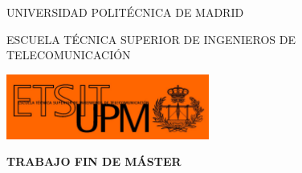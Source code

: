 \pagecolor{etsitorange}
\begin{titlepage}
	\centering
	{\scshape\LARGE UNIVERSIDAD POLITÉCNICA DE MADRID \par}
	\vspace{0.5cm}
	{\scshape\Large ESCUELA TÉCNICA SUPERIOR DE INGENIEROS DE TELECOMUNICACIÓN \par}
	\vspace{0.5cm}	
	\includegraphics[width=0.5\textwidth]{./img/01_front/logoescuela_naranja.jpg}\par\vspace{1cm} %
	{\huge\bfseries TRABAJO FIN DE MÁSTER\par}
	\vspace{0.5cm}
	{\scshape\Large \myMaster \par}
	\vspace{1cm}
	{\huge\bfseries \myTitleEN \par}
	\vspace{1cm}
	{\Large\itshape \myFullname \par}
	\vfill
	{\large \currentYear \par}
\end{titlepage}
\pagecolor{white}

\afterpage{\blankpage}
\cleardoublepage
